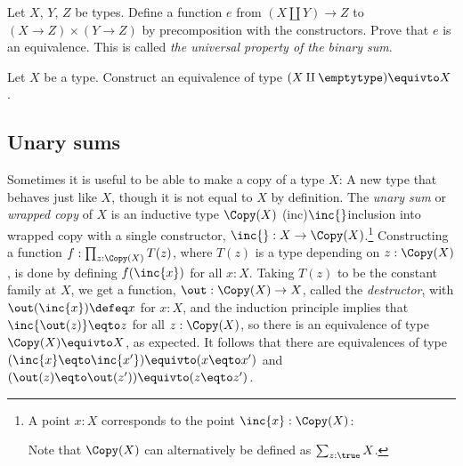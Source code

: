 \begin{xca}\label{xca:bin-sum-univ-prop}
  Let $X$, $Y$, $Z$ be types. Define a function $e$ from
  $(X\amalg Y)\to Z$ to $(X\to Z)\times(Y\to Z)$ by precomposition
  with the constructors.
  Prove that $e$ is an equivalence.
  This is called \emph{the universal property of the binary sum}.
\end{xca}

\begin{xca}
  Let $X$ be a type.  Construct an equivalence of type $(X \amalg \emptytype) \equivto X$.
\end{xca}

\subsection{Unary sums}\label{sec:unary-sum-types}

Sometimes it is useful to be able to make a copy of a type $X$:
A new type that behaves just like $X$,
though it is not equal to $X$ by definition.
The \emph{unary sum} or \emph{wrapped copy} of $X$ is an inductive type $\Copy(X)$
%
\glossary(inc){$\protect\inc{}$}{inclusion into wrapped copy}%
with a single constructor, $\inc{} : X \to \Copy(X)$.\footnote{%
  A point $x:X$ corresponds to the point $\inc{x}:\Copy(X)$:\par
  \par
  \noindent Note that $\Copy(X)$ can alternatively be defined as $\sum_{z:\true}X$.}
Constructing a function $f : \prod_{z:\Copy(X)}T(z)$,
where $T(z)$ is a type depending on $z : \Copy(X)$,
is done by defining $f(\inc{x})$ for all $x:X$.
Taking $T(z)$ to be the constant family at $X$,
we get a function, $\out : \Copy(X) \to X$,
called the \emph{destructor},
with $\out(\inc{x}) \defeq x$ for $x:X$,
and the induction principle implies that $\inc{\out(z)} \eqto z$
for all $z:\Copy(X)$, so there is an equivalence of type
$\Copy(X) \equivto X$, as expected.
It follows that there are equivalences of type
$(\inc{x} \eqto \inc{x'}) \equivto (x \eqto x')$ and
$(\out(z) \eqto \out(z')) \equivto (z \eqto z')$.

